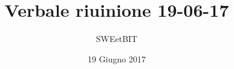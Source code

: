 


\usepackage{ragged2e}

\title{\textbf{Verbale riuinione 19-06-17}}
\author{SWEetBIT}

\date{19 Giugno 2017}




\makeFrontPage
%
\tableofcontents





